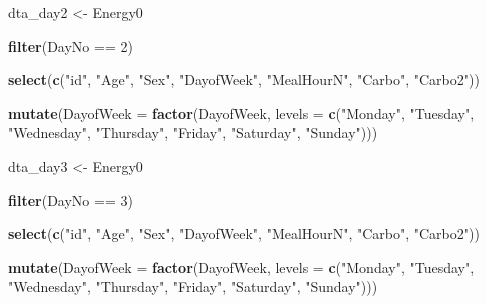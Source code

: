 \documentclass[]{article}
\newenvironment{Shaded}{\begin{snugshade}}{\end{snugshade}}
\newcommand{\KeywordTok}[1]{\textcolor[rgb]{0.12,0.11,0.11}{\textbf{#1}}}
\newcommand{\DataTypeTok}[1]{\textcolor[rgb]{0.00,0.34,0.68}{#1}}
\newcommand{\DecValTok}[1]{\textcolor[rgb]{0.69,0.50,0.00}{#1}}
\newcommand{\StringTok}[1]{\textcolor[rgb]{0.75,0.01,0.01}{#1}}
\newcommand{\OperatorTok}[1]{\textcolor[rgb]{0.12,0.11,0.11}{#1}}
\newcommand{\NormalTok}[1]{\textcolor[rgb]{0.12,0.11,0.11}{#1}}
\begin{document}
\begin{Shaded}
\begin{Highlighting}[]
{{{{{{{{{{\NormalTok{dta_day2 <-}\StringTok{ }\NormalTok{Energy0 }\OperatorTok{%>%}\StringTok{ }
\StringTok{  }\KeywordTok{filter}\NormalTok{(DayNo }\OperatorTok{==}\StringTok{ }\DecValTok{2}\NormalTok{) }\OperatorTok{%>%}\StringTok{ }
\StringTok{  }\KeywordTok{select}\NormalTok{(}\KeywordTok{c}\NormalTok{(}\StringTok{"id"}\NormalTok{, }\StringTok{"Age"}\NormalTok{, }
    \StringTok{"Sex"}\NormalTok{, }\StringTok{"DayofWeek"}\NormalTok{, }\StringTok{"MealHourN"}\NormalTok{, }\StringTok{"Carbo"}\NormalTok{, }\StringTok{"Carbo2"}\NormalTok{)) }\OperatorTok{%>%}\StringTok{ }
\StringTok{  }\KeywordTok{mutate}\NormalTok{(}\DataTypeTok{DayofWeek =} \KeywordTok{factor}\NormalTok{(DayofWeek, }
    \DataTypeTok{levels =} \KeywordTok{c}\NormalTok{(}\StringTok{"Monday"}\NormalTok{, }\StringTok{"Tuesday"}\NormalTok{, }\StringTok{"Wednesday"}\NormalTok{, }\StringTok{"Thursday"}\NormalTok{, }\StringTok{"Friday"}\NormalTok{, }
        \StringTok{"Saturday"}\NormalTok{, }\StringTok{"Sunday"}\NormalTok{)))}

\NormalTok{dta_day3 <-}\StringTok{ }\NormalTok{Energy0 }\OperatorTok{%>%}\StringTok{ }
\StringTok{  }\KeywordTok{filter}\NormalTok{(DayNo }\OperatorTok{==}\StringTok{ }\DecValTok{3}\NormalTok{) }\OperatorTok{%>%}\StringTok{ }
\StringTok{  }\KeywordTok{select}\NormalTok{(}\KeywordTok{c}\NormalTok{(}\StringTok{"id"}\NormalTok{, }\StringTok{"Age"}\NormalTok{, }
    \StringTok{"Sex"}\NormalTok{, }\StringTok{"DayofWeek"}\NormalTok{, }\StringTok{"MealHourN"}\NormalTok{, }\StringTok{"Carbo"}\NormalTok{, }\StringTok{"Carbo2"}\NormalTok{)) }\OperatorTok{%>%}\StringTok{ }
\StringTok{  }\KeywordTok{mutate}\NormalTok{(}\DataTypeTok{DayofWeek =} \KeywordTok{factor}\NormalTok{(DayofWeek, }
    \DataTypeTok{levels =} \KeywordTok{c}\NormalTok{(}\StringTok{"Monday"}\NormalTok{, }\StringTok{"Tuesday"}\NormalTok{, }\StringTok{"Wednesday"}\NormalTok{, }\StringTok{"Thursday"}\NormalTok{, }\StringTok{"Friday"}\NormalTok{, }
        \StringTok{"Saturday"}\NormalTok{, }\StringTok{"Sunday"}\NormalTok{)))}

}}}}}}}}}}}}}}}}
\end{Highlighting}
\end{Shaded}
\end{document}
